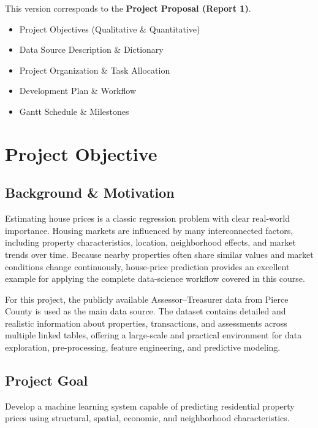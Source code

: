 \documentclass[
  english,
  letterpaper,
  DIV=11,
  numbers=noendperiod]{scrreprt}
\providecommand{\tightlist}{%
  \setlength{\itemsep}{0pt}\setlength{\parskip}{0pt}}
\begin{document}
This version corresponds to the \textbf{Project Proposal (Report 1)}.

\begin{itemize}
\tightlist
\item[$\boxtimes$]
  Project Objectives (Qualitative \& Quantitative)
\item[$\boxtimes$]
  Data Source Description \& Dictionary
\item[$\boxtimes$]
  Project Organization \& Task Allocation
\item[$\boxtimes$]
  Development Plan \& Workflow
\item[$\boxtimes$]
  Gantt Schedule \& Milestones
\end{itemize}


\chapter{Project Objective}\label{project-objective}

\section{Background \& Motivation}\label{background-motivation}

Estimating house prices is a classic regression problem with clear
real-world importance. Housing markets are influenced by many
interconnected factors, including property characteristics, location,
neighborhood effects, and market trends over time. Because nearby
properties often share similar values and market conditions change
continuously, house-price prediction provides an excellent example for
applying the complete data-science workflow covered in this course.

For this project, the publicly available Assessor--Treasurer data from
Pierce County is used as the main data source. The dataset contains
detailed and realistic information about properties, transactions, and
assessments across multiple linked tables, offering a large-scale and
practical environment for data exploration, pre-processing, feature
engineering, and predictive modeling.

\section{Project Goal}\label{project-goal}

Develop a machine learning system capable of predicting residential
property prices using structural, spatial, economic, and neighborhood
characteristics.
\end{document}
